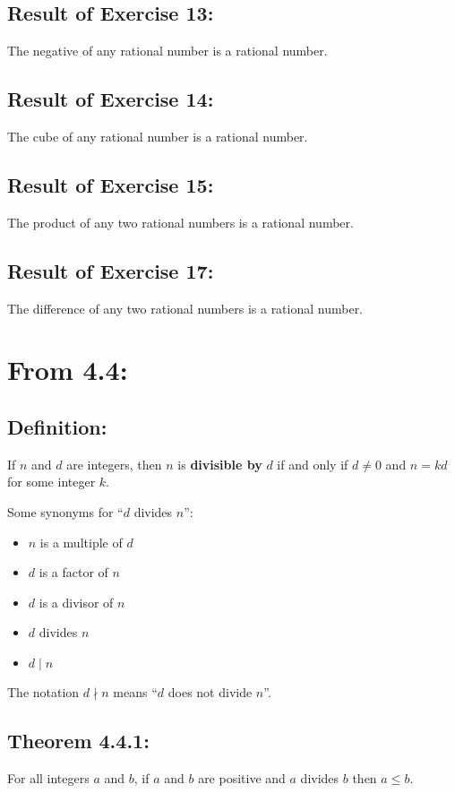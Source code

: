 \documentclass[11pt]{article}
\begin{document}
\subsection*{Result of Exercise 13:}
The negative of any rational number is a rational number. 

\subsection*{Result of Exercise 14:}
The cube of any rational number is a rational number. 

\subsection*{Result of Exercise 15:}
The product of any two rational numbers is a rational number. 

\subsection*{Result of Exercise 17:}
The difference of any two rational numbers is a rational number. 

\newpage
\section*{From 4.4:}

\subsection*{Definition:}
If $n$ and $d$ are integers, then $n$ is {\bf divisible by} 
$d$ if and only if $d \neq 0$ and $n = kd$ for some integer 
$k$. 

Some synonyms for ``$d$ divides $n$'':
\begin{itemize}
    \item $n$ is a multiple of $d$
    \item $d$ is a factor of $n$
    \item $d$ is a divisor of $n$
    \item $d$ divides $n$
    \item $d \mid n$
\end{itemize}

The notation $d \nmid n$ means ``$d$ does not divide $n$''. 

\subsection*{Theorem 4.4.1:} 
For all integers $a$ and $b$, if $a$ and $b$ are positive 
and $a$ divides $b$ then $a \leq b$. 
\end{document}
